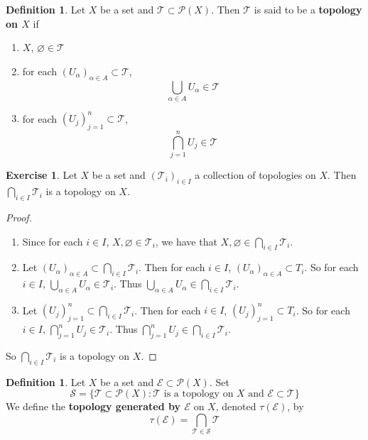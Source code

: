 \documentclass[12pt]{amsart}
\theoremstyle{definition}
\newtheorem{defn}[definition]{Definition}
\newtheorem{ex}[definition]{Exercise}
\newcommand{\al}{\alpha}
\newcommand{\MS}{\mathcal{S}}
\newcommand{\MP}{\mathcal{P}}
\newcommand{\ME}{\mathcal{E}}
\newcommand{\MT}{\mathcal{T}}
\newcommand{\tbf}[1]{\textbf{#1}}
\DeclareMathOperator*{\0}{\mbf{0}}
\DeclareMathOperator*{\1}{\mbf{1}}
\newcommand{\lex}[1]{\label{ex:#1}}
\newcommand{\ld}[1]{\label{defn:#1}}
\begin{document}
	\begin{defn} \ld{31001}
	Let $X$ be a set and $\MT \subset \MP(X)$. Then $\MT$ is said to be a \tbf{topology on $X$} if 
	\begin{enumerate}
	\item $X$, $\varnothing \in \MT$ 
	\item for each $(U_{\al})_{\al \in A} \subset \MT$, $$\bigcup_{\al \in A}U_{\al} \in \MT$$
	\item for each $(U_j)_{j=1}^n \subset \MT$, $$\bigcap_{j=1}^n U_{j} \in \MT$$
	\end{enumerate}
	\end{defn}		
	
	\begin{ex} \lex{31002} 
		Let $X$ be a set and $(\MT_{i})_{i \in I}$ a collection of topologies on $X$. Then $\bigcap\limits_{i \in I}\MT_i$ is a topology on $X$.
	\end{ex}
	
	\begin{proof}\
	\begin{enumerate}
	\item Since for each $i \in I$, $X, \varnothing \in \MT_{i}$, we have that $X, \varnothing \in \bigcap\limits_{i \in I}\MT_i$.
	\item Let $(U_{\al})_{\al \in A} \subset \bigcap\limits_{i \in I}\MT_i$. Then for each $i \in I$, $(U_{\al})_{\al \in A} \subset T_i$. So for each $i \in I$, $\bigcup\limits_{\al \in A}U_{\al} \in \MT_i$. Thus $\bigcup\limits_{\al \in A}U_{\al} \in \bigcap\limits_{i \in I}\MT_i$.
	\item Let $(U_{j})_{j=1}^n \subset \bigcap\limits_{i \in I}\MT_i$. Then for each $i \in I$, $(U_{j})_{j=1}^n \subset T_i$. So for each $i \in I$, $\bigcap\limits_{j=1}^n U_{j} \in \MT_i$. Thus $\bigcap\limits_{j=1}^n U_{j} \in \bigcap\limits_{i \in I}\MT_i$.
	\end{enumerate}
	So $\bigcap\limits_{i \in I}\MT_i$ is a topology on $X$.
	\end{proof}
	
	\begin{defn} \ld{31003}
	Let $X$ be a set and $\ME \subset \MP(X)$. Set 
	\begin{equation*}
	\MS = \{\MT \subset \MP(X): \MT \text{ is a topology 	on $X$ and $\ME \subset \MT$}\}
	\end{equation*}	 
We define the \tbf{topology generated by $\ME$} on $X$, denoted $\tau(\ME)$, by $$\tau(\ME) = \bigcap_{\MT \in \MS} \MT$$
	\end{defn}
	
\end{document}
